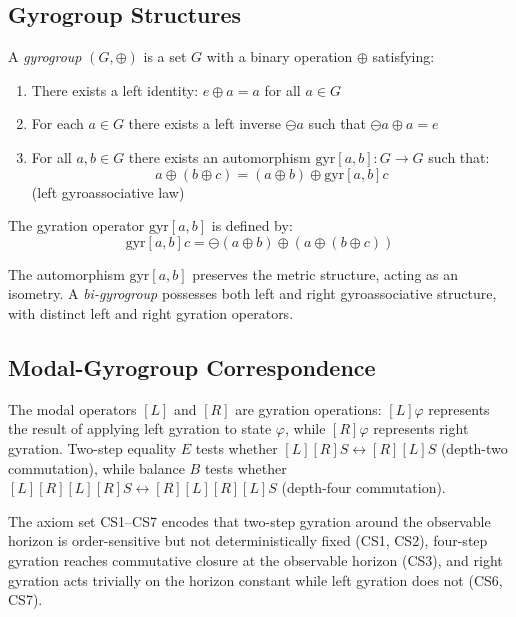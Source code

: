 \documentclass[11pt,a4paper]{article}
\theoremstyle{definition}
\theoremstyle{remark}
\begin{document}
\subsection{Gyrogroup Structures}

A \textit{gyrogroup} $(G, \oplus)$ \cite{Ungar2001,Ungar2008} is a set $G$ with a binary operation $\oplus$ satisfying:
\begin{enumerate}
\item There exists a left identity: $e \oplus a = a$ for all $a \in G$
\item For each $a \in G$ there exists a left inverse $\ominus a$ such that $\ominus a \oplus a = e$
\item For all $a, b \in G$ there exists an automorphism $\mathrm{gyr}[a,b]: G \to G$ such that:
\begin{equation}
a \oplus (b \oplus c) = (a \oplus b) \oplus \mathrm{gyr}[a,b]c
\end{equation}
(left gyroassociative law)
\end{enumerate}

The gyration operator $\mathrm{gyr}[a,b]$ is defined by:
\begin{equation}
\mathrm{gyr}[a,b]c = \ominus(a \oplus b) \oplus (a \oplus (b \oplus c))
\end{equation}

The automorphism $\mathrm{gyr}[a,b]$ preserves the metric structure, acting as an isometry. A \textit{bi-gyrogroup} possesses both left and right gyroassociative structure, with distinct left and right gyration operators.

\subsection{Modal-Gyrogroup Correspondence}

The modal operators $[L]$ and $[R]$ are gyration operations: $[L]\varphi$ represents the result of applying left gyration to state $\varphi$, while $[R]\varphi$ represents right gyration. Two-step equality $E$ tests whether $[L][R]S \leftrightarrow [R][L]S$ (depth-two commutation), while balance $B$ tests whether $[L][R][L][R]S \leftrightarrow [R][L][R][L]S$ (depth-four commutation).

The axiom set CS1--CS7 encodes that two-step gyration around the observable horizon is order-sensitive but not deterministically fixed (CS1, CS2), four-step gyration reaches commutative closure at the observable horizon (CS3), and right gyration acts trivially on the horizon constant while left gyration does not (CS6, CS7).
\end{document}
